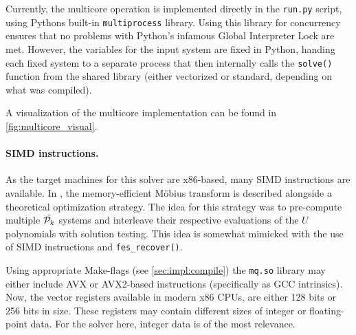 Currently, the multicore operation is implemented directly in the \texttt{run.py} script, using Pythons built-in \texttt{multiprocess} library. Using this library for concurrency ensures that no problems with Python's infamous Global Interpreter Lock are met. However, the variables for the input system are fixed in Python, handing each fixed system to a separate process that then internally calls the \texttt{solve()} function from the shared library (either vectorized or standard, depending on what was compiled).

A visualization of the multicore implementation can be found in \cref{fig:multicore_visual}.

\paragraph{SIMD instructions.} As the target machines for this solver are x86-based, many SIMD instructions are available. In \cite{eurocrypt-2021-30841}, the memory-efficient Möbius transform is described alongside a theoretical optimization strategy. The idea for this strategy was to pre-compute multiple $\Tilde{\mathcal{P}_k}$ systems and interleave their respective evaluations of the $U$ polynomials with solution testing. This idea is somewhat mimicked with the use of SIMD instructions and \texttt{fes\_recover()}.

Using appropriate Make-flags (see \cref{sec:impl:compile}) the \texttt{mq.so} library may either include AVX or AVX2-based instructions (specifically as GCC intrinsics). Now, the vector registers available in modern x86 CPUs, are either 128 bits or 256 bits in size. These registers may contain different sizes of integer or floating-point data. For the solver here, integer data is of the most relevance.

